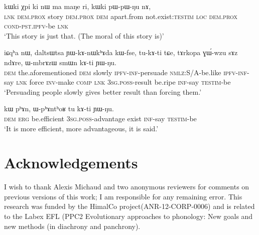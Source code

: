\documentclass[12pt]{article}
\newcommand{\ipab}[1]{{\phon#1}}
\newcommand{\gltt}{ \vspace{-1em}  \glt}
\begin{document}
\begin{myexe} 
\gll   \ipab{tɕendɤre} \ipab{kɯki} \ipab{χpi} \ipab{ki} \ipab{nɯ} \ipab{ma} \ipab{maŋe} \ipab{ri,} \ipab{kɯki} \ipab{pɯ-pɯ-ŋu} \ipab{nɤ,} \\ 
  \textsc{lnk}  \textsc{dem}.\textsc{prox} story \textsc{dem}.\textsc{prox} \textsc{dem} apart.from not.exist:\textsc{testim} \textsc{loc} \textsc{dem}.\textsc{prox} \textsc{cond}-\textsc{pst}.\textsc{ipfv}-be  \textsc{lnk} \\ 
 \gltt  `This story is just that. (The moral of this story is)'
\end{myexe} 

\begin{myexe} 
\gll   \ipab{nɤkinɯ,} \ipab{iɕqʰa} \ipab{nɯ,} \ipab{daltsɯtsa} \ipab{ɲɯ-kɤ-nɯkʰɤda} \ipab{kɯ-fse,} \ipab{tu-kɤ-ti}  \ipab{tɕe,} \ipab{tɤrkopa} \ipab{ɣɯ́-wzu} \ipab{sɤz} \ipab{ndɤre,} \ipab{ɯ-mbrɤzɯ} \ipab{smɯn} \ipab{kɤ-ti} \ipab{ɲɯ-ŋu.}\\ 
 \textsc{dem} the.aforementioned \textsc{dem} slowly     \textsc{ipfv}-\textsc{inf}-persuade   \textsc{nmlz}:S/A-be.like \textsc{ipfv}-\textsc{inf}-say \textsc{lnk}  force    \textsc{inv}-make \textsc{comp} \textsc{lnk}    3\textsc{sg}.\textsc{poss}-result   be.ripe \textsc{inf}-say \textsc{testim}-be\\ 
 \gltt `Persuading people slowly gives better result than forcing them.' 
\end{myexe} 
 
\begin{myexe} 
\gll   \ipab{nɯ} \ipab{kɯ} \ipab{pʰɤn,} \ipab{ɯ-pʰɤntʰoʁ} \ipab{tu} \ipab{kɤ-ti} \ipab{ɲɯ-ŋu.} \\ 
 \textsc{dem} \textsc{erg} be.efficient 3\textsc{sg}.\textsc{poss}-advantage    exist \textsc{inf}-say \textsc{testim}-be\\  
 \gltt  `It is more efficient, more advantageous, it is said.'
\end{myexe} 

\section*{Acknowledgements}

I wish to thank Alexis Michaud and two anonymous reviewers for comments on previous versions of this work; I am responsible for any remaining error. This research was funded by the HimalCo project(ANR-12-CORP-0006) and is related to the Labex EFL (PPC2 Evolutionary approaches to phonology: New goals and new methods (in diachrony and panchrony). 
\end{document}
